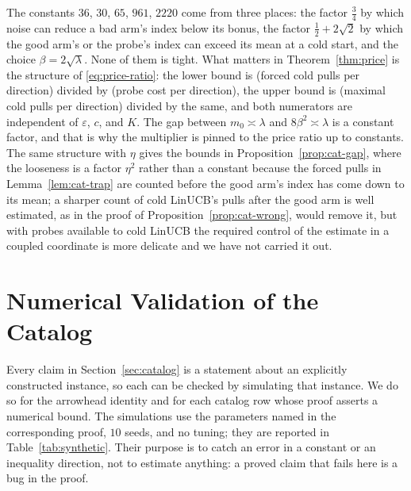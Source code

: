 \documentclass{article}
\theoremstyle{definition}
\theoremstyle{remark}
\newcommand{\eps}{\varepsilon}
\theoremstyle{remark}
\begin{document}
The constants $36$, $30$, $65$, $961$, $2220$ come from three places: the
factor $\tfrac34$ by which noise can reduce a bad arm's index below its bonus,
the factor $\tfrac12+2\sqrt2$ by which the good arm's or the probe's index can
exceed its mean at a cold start, and the choice $\beta=2\sqrt\lambda$. None of
them is tight. What matters in Theorem~\ref{thm:price} is the structure of
\eqref{eq:price-ratio}: the lower bound is (forced cold pulls per direction)
divided by (probe cost per direction), the upper bound is (maximal cold pulls
per direction) divided by the same, and both numerators are independent of
$\eps$, $c$, and $K$. The gap between $m_0\asymp\lambda$ and $8\beta^2\asymp\lambda$
is a constant factor, and that is why the multiplier is pinned to the price
ratio up to constants. The same structure with $\eta$ gives the bounds in
Proposition~\ref{prop:cat-gap}, where the looseness is a factor $\eta^2$ rather
than a constant because the forced pulls in Lemma~\ref{lem:cat-trap} are
counted before the good arm's index has come down to its mean; a sharper
count of cold LinUCB's pulls after the good arm is well estimated, as in the
proof of Proposition~\ref{prop:cat-wrong}, would remove it, but with probes
available to cold LinUCB the required control of the estimate in a coupled
coordinate is more delicate and we have not carried it out.


\section{Numerical Validation of the Catalog}
\label{app:synthetic}

Every claim in Section~\ref{sec:catalog} is a statement about an explicitly
constructed instance, so each can be checked by simulating that instance. We
do so for the arrowhead identity and for each catalog row whose proof asserts
a numerical bound. The simulations use the parameters named in the
corresponding proof, $10$ seeds, and no tuning; they are reported in
Table~\ref{tab:synthetic}. Their purpose is to catch an error in a constant or
an inequality direction, not to estimate anything: a proved claim that fails
here is a bug in the proof.
\end{document}
